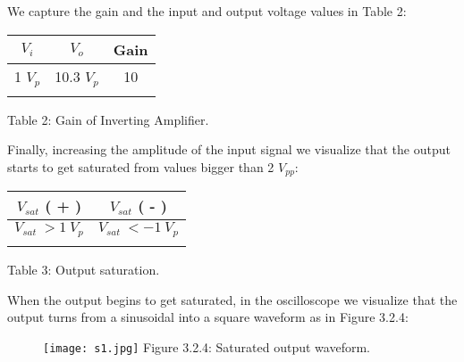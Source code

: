 We capture the gain and the input and output voltage values in Table 2: \hfill \break

\begin{center}
\begin{tabular}[.5cm]{c c c}
\toprule
\toprule
\hspace{60pt} $V_{i}$ \hspace{60pt} & \hspace{60pt} $V_{o}$ \hspace{60pt} & \hspace{60pt}  {\bfseries Gain} \hspace{60pt}  \\
\midrule
\midrule
1 $V_{p}$ & 10.3 $V_{p}$ & 10 \\
\bottomrule
\linebreak
\end{tabular}
\linebreak Table 2: Gain of Inverting Amplifier.
\end{center} 

\pagebreak

Finally, increasing the amplitude of the input signal we visualize that the output starts to get saturated from values bigger than 2 $V_{pp}$: \hfill \break

\begin{center}
\begin{tabular}[.5cm]{c c}
\toprule
\toprule
\hspace{85pt} $V_{sat}$ ( + ) \hspace{85pt} & \hspace{85pt} $V_{sat}$ ( - ) \hspace{85pt} \\
\midrule
\midrule
$V_{sat}\ > 1\ V_{p}$ & $V_{sat}\ < -1\ V_{p}$ \\
\bottomrule
\linebreak
\end{tabular}
\linebreak Table 3: Output saturation.
\end{center} \hfill

When the output begins to get saturated, in the oscilloscope we visualize that the output turns from a sinusoidal into a square waveform as in Figure 3.2.4: \hfill \break

\begin{figure}[H]
\texttt{[image: s1.jpg]}
\centering \linebreak \linebreak Figure 3.2.4: Saturated output waveform.
\end{figure}

\pagebreak